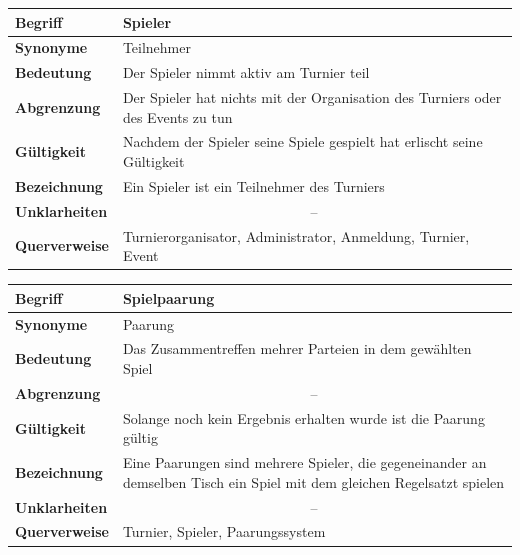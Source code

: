 \documentclass[11pt]{article}
\begin{document}
\begin{tabularx}{\textwidth}{| p{} | p{} |}
	\hline
	\textbf{Begriff} & Spieler\\
	\hline
	\textbf{Synonyme} & Teilnehmer \\
	\hline
	\textbf{Bedeutung} & Der Spieler nimmt aktiv am Turnier teil\\
	\hline
	\textbf{Abgrenzung} & Der Spieler hat nichts mit der Organisation des Turniers oder des Events zu tun\\
	\hline
	\textbf{Gültigkeit} & Nachdem der Spieler seine Spiele gespielt hat erlischt seine Gültigkeit\\
	\hline
	\textbf{Bezeichnung} & Ein Spieler ist ein Teilnehmer des Turniers\\
	\hline
	\textbf{Unklarheiten} & \multicolumn{1}{c|}{--} \\
	\hline
	\textbf{Querverweise} & Turnierorganisator, Administrator, Anmeldung, Turnier, Event \\
	\hline
\end{tabularx}

\newpage
	
\begin{tabularx}{\textwidth}{| p{} | p{} |}
	\hline
	\textbf{Begriff} & Spielpaarung\\
	\hline
	\textbf{Synonyme} & Paarung\\
	\hline
	\textbf{Bedeutung} & Das Zusammentreffen mehrer Parteien in dem gewählten Spiel\\
	\hline
	\textbf{Abgrenzung} & \multicolumn{1}{c|}{--} \\
	\hline
	\textbf{Gültigkeit} & Solange noch kein Ergebnis erhalten wurde ist die Paarung gültig\\
	\hline
	\textbf{Bezeichnung} & Eine Paarungen sind mehrere Spieler, die gegeneinander an demselben Tisch ein Spiel mit dem gleichen Regelsatzt spielen\\
	\hline 
	\textbf{Unklarheiten} & \multicolumn{1}{c|}{--} \\
	\hline
	\textbf{Querverweise} &  Turnier, Spieler, Paarungssystem\\
	\hline
\end{tabularx}
\end{document}
